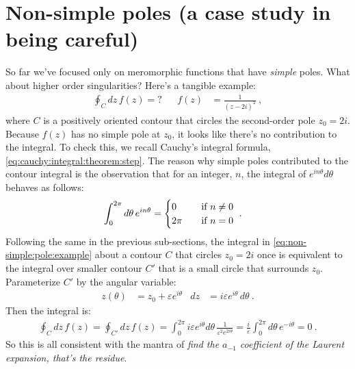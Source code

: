 \documentclass[
  11pt,
	colorful,
	raggedright,
]{tufte-style-thesis-flip}
\begin{document}
\section{Non-simple poles (a case study in being careful)}
\label{sec:complex:cauchy:int:thm:factorizing:be:careful}

So far we've focused only on meromorphic functions that have \emph{simple} poles. What about higher order singularities? Here's a tangible example:
\begin{align}
  \oint_C dz \, f(z) = ?
  &&
  f(z) &= \frac{1}{(z-2i)^2} \ ,
  \label{eq:non-simple:pole:example}
\end{align}
where $C$ is a positively oriented contour that circles the second-order pole $z_0 = 2i$. Because $f(z)$ has no simple pole at $z_0$, it looks like there's no contribution to the integral. To check this, we recall Cauchy's integral formula, \eqref{eq:cauchy:integral:theorem:step}. The reason why simple poles contributed to the contour integral is the observation that for an integer,  $n$, the integral of $e^{in\theta}d\theta$ behaves as follows: 
\begin{align}
  \int_0^{2\pi}d\theta\, e^{in\theta} 
  &=
  \begin{cases}
  0 & \text{\quad if } n\neq 0
  \\
  2\pi  & \text{\quad if } n= 0
  \end{cases} \ .
\end{align}
Following the same in the previous sub-sections, the integral in \eqref{eq:non-simple:pole:example} about a contour $C$ that circles $z_0=2i$ once is equivalent to the integral over smaller contour $C'$ that is a small circle that surrounds $z_0$. Parameterize $C'$ by the angular variable:
\begin{align}
  z(\theta) &= z_0 + \varepsilon e^{i\theta} & dz &= i\varepsilon e^{i\theta} \, d\theta \ .
\end{align}
Then the integral is:
\begin{align}
  \oint_C dz\, f(z) 
  = 
  \oint_{C'} dz\, f(z) 
  = 
  \int_0^{2\pi} i\varepsilon e^{i\theta} d\theta\, 
  \frac{1}{\varepsilon^2 e^{2i\theta}} 
  =
  \frac{i}{\varepsilon}
  \int_0^{2\pi} d\theta\, 
  e^{-i\theta}
  = 0 \ .
  \label{eq:non-simple:pole:eg:zero}
\end{align}
So this is all consistent with the mantra of \emph{find the $a_{-1}$ coefficient of the Laurent expansion, that's the residue}. 
\end{document}
